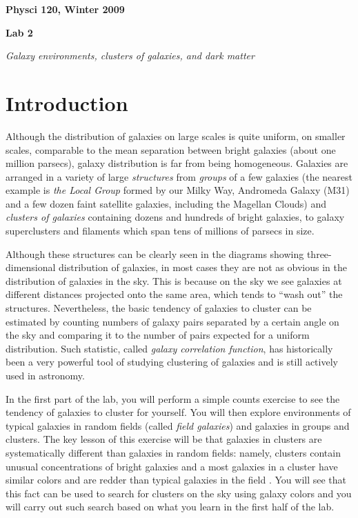 \documentclass[12pt]{article}
\begin{document}
\vspace*{-.7in}
\vspace{.7in}
\centerline{\large\bf Physci 120, Winter 2009}\vspace{0.4cm}
\centerline{\Large\bf Lab 2}\vspace{0.4cm}
\centerline{\Large\it  Galaxy environments, clusters of galaxies, and dark matter}
\vspace{.2in}

\section*{Introduction}

Although the distribution of galaxies on large scales is quite uniform, 
on smaller scales, comparable to the mean separation between bright galaxies
(about one million parsecs), galaxy distribution is far from being homogeneous. 
Galaxies are arranged in a variety of large {\it structures\/} from 
 {\it groups\/} of a few galaxies (the nearest example is {\it the Local Group} formed by our Milky Way, Andromeda Galaxy (M31) and a few dozen faint
satellite galaxies, including the Magellan Clouds) and 
{\it clusters of galaxies\/} containing dozens and hundreds of bright galaxies,
to galaxy superclusters and filaments which span tens of millions of parsecs
in size. 

Although these structures can be clearly seen in the diagrams
showing three-dimensional distribution of galaxies, in most cases 
they are not as obvious in the distribution of galaxies in the sky. 
This is because on the sky we see galaxies at different distances projected
onto the same area, which tends to ``wash out'' the structures. 
Nevertheless, the basic tendency of galaxies to cluster can be estimated
by counting numbers of galaxy pairs separated by a certain angle on the sky
and comparing it to the number of pairs expected for a uniform distribution. 
Such statistic, called {\it galaxy correlation function}, has historically 
been a very powerful tool of studying clustering of galaxies and is still actively
used in astronomy. 

In the first part of the lab, you will perform a simple counts
exercise to see the tendency of galaxies to cluster for yourself. You
will then explore environments of typical galaxies in random fields
(called {\it field galaxies}) and galaxies in groups and clusters. The
key lesson of this exercise will be that galaxies in clusters are
systematically different than galaxies in random fields: namely,
clusters contain unusual concentrations of bright galaxies and a
most galaxies in a cluster have similar colors and are redder than typical 
galaxies in the field . You will see that this fact can be used to search
for clusters on the sky using galaxy colors and you will carry out
such search based on what you learn in the first half of the lab.
\end{document}
